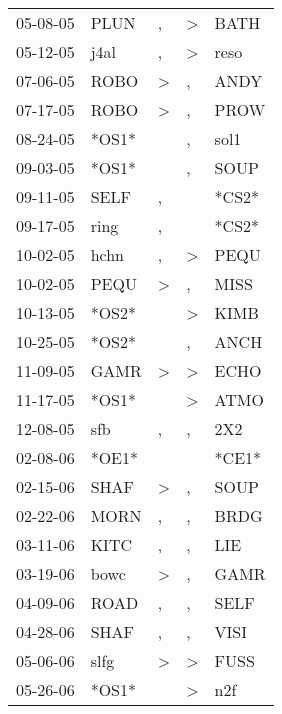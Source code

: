 \begin{supertabular}{lllll}
 05-08-05 &   PLUN &                , &     \textgreater &   BATH \\
 05-12-05 &   j4al &                , &     \textgreater &   reso \\
 07-06-05 &   ROBO &     \textgreater &                , &   ANDY \\
 07-17-05 &   ROBO &     \textgreater &                , &   PROW \\
 08-24-05 &  *OS1* &                  &                , &   sol1 \\
 09-03-05 &  *OS1* &                  &                , &   SOUP \\
 09-11-05 &   SELF &                , &                  &  *CS2* \\
 09-17-05 &   ring &                , &                  &  *CS2* \\
 10-02-05 &   hchn &                , &     \textgreater &   PEQU \\
 10-02-05 &   PEQU &     \textgreater &                , &   MISS \\
 10-13-05 &  *OS2* &                  &     \textgreater &   KIMB \\
 10-25-05 &  *OS2* &                  &                , &   ANCH \\
 11-09-05 &   GAMR &     \textgreater &     \textgreater &   ECHO \\
 11-17-05 &  *OS1* &                  &     \textgreater &   ATMO \\
 12-08-05 &    sfb &                , &                , &    2X2 \\
 02-08-06 &  *OE1* &                  &                  &  *CE1* \\
 02-15-06 &   SHAF &     \textgreater &                , &   SOUP \\
 02-22-06 &   MORN &                , &                , &   BRDG \\
 03-11-06 &   KITC &                , &                , &    LIE \\
 03-19-06 &   bowc &     \textgreater &                , &   GAMR \\
 04-09-06 &   ROAD &                , &                , &   SELF \\
 04-28-06 &   SHAF &                , &                , &   VISI \\
 05-06-06 &   slfg &     \textgreater &     \textgreater &   FUSS \\
 05-26-06 &  *OS1* &                  &     \textgreater &    n2f \\

\end{supertabular}
